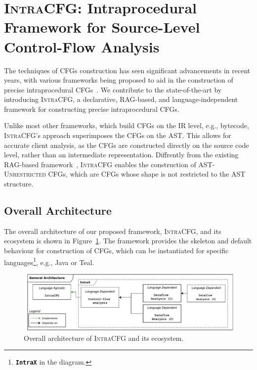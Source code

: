\section{\textsc{IntraCFG}: Intraprocedural Framework for Source-Level Control-Flow Analysis}%
\label{sec:IntraCFG}
The techniques of CFGs construction has seen significant advancements
in recent years, with various frameworks being proposed to aid in the construction
of precise intraprocedural CFGs~\cite{smits2020flowspec,10.1016/j.scico.2012.02.002}.
We contribute to the state-of-the-art by introducing \textsc{IntraCFG}, a declarative, RAG-based,
and language-independent framework for constructing precise intraprocedural CFGs.

Unlike most other frameworks, which build CFGs on the IR level,
e.g.,  bytecode, \textsc{IntraCFG}'s approach superimposes the CFGs
on the AST. This allows for accurate client analysis,
as the CFGs are constructed directly on the source code level, rather than an
intermediate representation.
Diffrently from the existing RAG-based framework~\cite{10.1016/j.scico.2012.02.002},
\textsc{IntraCFG} enables the construction of \textsc{AST-Unrestricted} CFGs,
which are CFGs whose shape is not restricted to the AST structure.
\subsection{Overall Architecture}
The overall architecture of our proposed framework, \textsc{IntraCFG}, and its
ecosystem is shown in Figure~\ref{fig:intraCFG}.
The framework provides the skeleton and default behaviour for construction of CFGs,
which can be instantiated for specific languages\footnote{\textbf{\texttt{IntraX}} in the diagram.}, e.g., Java or Teal.
\begin{figure}[H]
    \centering
    \includegraphics[width=1\textwidth]{kappa/img/architecture.pdf}
    \caption{\label{fig:intraCFG} Overall architecture of \textsc{IntraCFG} and its ecosystem.}
\end{figure}

